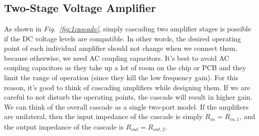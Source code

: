 \section{\topicB}
\subsection{Two-Stage Voltage Amplifier}
As shown in \emph{Fig.~\ref{fig:1cascade}}, simply cascading two amplifier stages is possible if the DC voltage levels are compatible. In other words, the desired operating point of each individual amplifier should not change when we connect them, because otherwise, we need AC coupling capacitors.  It's best to avoid AC coupling capacitors as they take up a lot of room on the chip or PCB and they limit the range of operation (since they kill the low frequency gain).  For this reason, it's good to think of cascading amplifiers while designing them.  If we are careful to not disturb the operating points, the cascade will result in higher gain.  We can think of the overall cascade as a single two-port model.  If the amplifiers are unilateral, then the input impedance of the cascade is simply  $R_{in} = R_{in,1}$, and the output impedance of the cascade is $R_{out} = R_{out,2}$.
